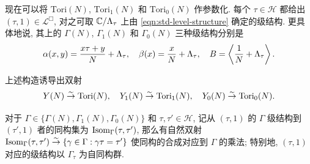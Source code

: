 现在可以将 $\mathrm{Tori}(N)$, $\mathrm{Tori}_1(N)$ 和 $\mathrm{Tori}_0(N)$ 作参数化. 每个 $\tau \in \mathcal{H}$ 都给出 $(\tau, 1) \in \mathcal{L}^\Box$, 对之可取 $\mathbb{C}/\Lambda_\tau$ 上由 \eqref{eqn:std-level-structure} 确定的级结构. 更具体地说, 其上的 $\Gamma(N)$, $\Gamma_1(N)$ 和 $\Gamma_0(N)$ 三种级结构分别是
\[ \alpha(x, y) = \frac{x\tau + y}{N} + \Lambda_\tau, \quad \beta(x) = \frac{x}{N} + \Lambda_\tau, \quad B = \left\langle \frac{1}{N} + \Lambda_\tau \right\rangle. \]

\begin{theorem}\label{prop:Y(N)-moduli}
	上述构造诱导出双射
	\[ Y(N) \stackrel{\sim}{\rightarrow} \mathrm{Tori}(N), \quad Y_1(N) \stackrel{\sim}{\rightarrow} \mathrm{Tori}_1(N), \quad Y_0(N) \stackrel{\sim}{\rightarrow} \mathrm{Tori}_0(N). \]

	对于 $\Gamma \in \{\Gamma(N), \Gamma_1(N), \Gamma_0(N)\}$ 和 $\tau, \tau' \in \mathcal{H}$, 记从 $(\tau, 1)$ 的 $\Gamma$ 级结构到 $(\tau', 1)$ 者的同构集为 $\operatorname{Isom}_\Gamma(\tau, \tau')$, 那么有自然双射 $\operatorname{Isom}_\Gamma(\tau, \tau') \stackrel{\sim}{\rightarrow} \{\gamma \in \Gamma: \gamma\tau = \tau' \}$ 使同构的合成对应到 $\Gamma$ 的乘法; 特别地, $(\tau, 1)$ 对应的级结构以 $\Gamma_\tau$ 为自同构群.
\end{theorem}


